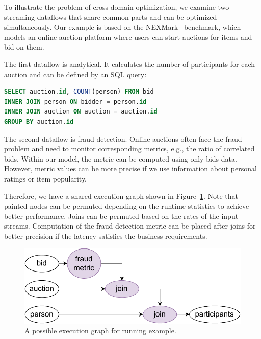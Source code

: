 To illustrate the problem of cross-domain optimization, we examine two streaming dataflows that share common parts and can be optimized simultaneously. Our example is based on the NEXMark~\cite{tucker2008nexmark} benchmark, which models an online auction platform where users can start auctions for items and bid on them.

The first dataflow is analytical. It calculates the number of participants for each auction and can be defined by an SQL query:
\begin{lstlisting}[language=SQL]
SELECT auction.id, COUNT(person) FROM bid
INNER JOIN person ON bidder = person.id
INNER JOIN auction ON auction = auction.id
GROUP BY auction.id
\end{lstlisting}

The second dataflow is fraud detection. Online auctions often face the fraud problem and need to monitor corresponding metrics, e.g., the ratio of correlated bids. Within our model, the metric can be computed using only bids data. However, metric values can be more precise if we use information about personal ratings or item popularity. 

Therefore, we have a shared execution graph shown in Figure~\ref{running_example}. Note that painted nodes can be permuted depending on the runtime statistics to achieve better performance. Joins can be permuted based on the rates of the input streams. Computation of the fraud detection metric can be placed after joins for better precision if the latency satisfies the business requirements.

\begin{figure}[h!]
    \includegraphics[width=\linewidth]{images/poster.pdf}
    \caption{A possible execution graph for running example.}
    \label{running_example}
\end{figure}
